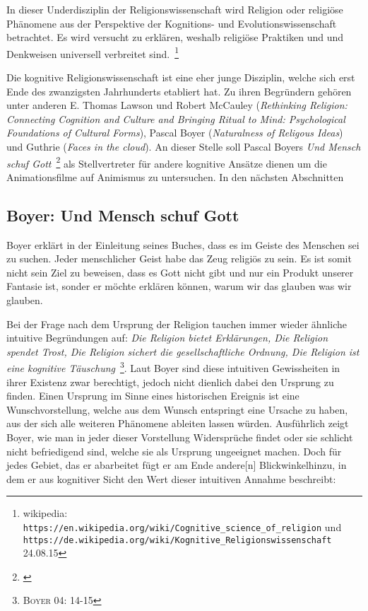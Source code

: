 In dieser Underdisziplin der Religionswissenschaft wird Religion oder religiöse Phänomene aus der Perspektive der Kognitions- und Evolutionswissenschaft betrachtet. Es wird versucht zu erklären, weshalb religiöse Praktiken und und Denkweisen universell verbreitet sind.~\footnote{wikipedia: \texttt{https://en.wikipedia.org/wiki/Cognitive\_science\_of\_religion} und \texttt{https://de.wikipedia.org/wiki/Kognitive\_Religionswissenschaft} 24.08.15}

Die kognitive Religionswissenschaft ist eine eher junge Disziplin, welche sich erst Ende des zwanzigsten Jahrhunderts etabliert hat. Zu ihren Begründern gehören unter anderen E. Thomas Lawson und Robert McCauley (\emph{Rethinking Religion: Connecting Cognition and Culture and Bringing Ritual to Mind: Psychological Foundations of Cultural Forms}), Pascal Boyer (\emph{Naturalness of Religous Ideas}) und Guthrie (\emph{Faces in the cloud}). An dieser Stelle soll Pascal Boyers \emph{Und Mensch schuf Gott}~\footnote{\cite{boyer04}} als Stellvertreter für andere kognitive Ansätze dienen um die Animationsfilme auf Animismus zu untersuchen. In den nächsten Abschnitten 

\subsection*{Boyer: Und Mensch schuf Gott}
Boyer erklärt in der Einleitung seines Buches, dass es im Geiste des Menschen sei zu suchen. Jeder menschlicher Geist habe das Zeug religiös zu sein. Es ist somit nicht sein Ziel zu beweisen, dass es Gott nicht gibt und nur ein Produkt unserer Fantasie ist, sonder er möchte erklären können, warum wir das glauben was wir glauben.

Bei der Frage nach dem Ursprung der Religion tauchen immer wieder ähnliche intuitive Begründungen auf: \emph{Die Religion bietet Erklärungen, Die Religion spendet Trost, Die Religion sichert die gesellschaftliche Ordnung, Die Religion ist eine kognitive Täuschung}~\footnote{\textsc{Boyer 04: 14-15}}. Laut Boyer sind diese intuitiven Gewissheiten in ihrer Existenz zwar berechtigt, jedoch nicht dienlich dabei den Ursprung zu finden. Einen Ursprung im Sinne eines historischen Ereignis ist eine Wunschvorstellung, welche aus dem Wunsch entspringt eine Ursache zu haben, aus der sich alle weiteren Phänomene ableiten lassen würden. Ausführlich zeigt Boyer, wie man in jeder dieser Vorstellung Widersprüche findet oder sie schlicht nicht befriedigend sind, welche sie als Ursprung ungeeignet machen. Doch für jedes Gebiet, das er abarbeitet fügt er am Ende \glqq[einen] andere[n] Blickwinkel\grqq  hinzu, in dem er aus kognitiver Sicht den Wert dieser intuitiven Annahme beschreibt:

